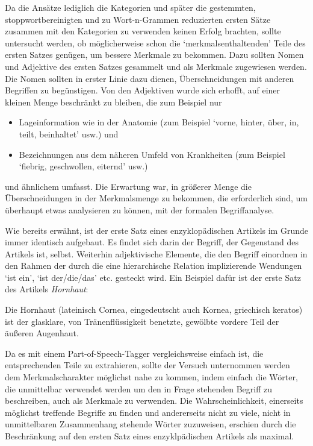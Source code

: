\documentclass[pagesize,DIV=calc,12pt,draft]{scrreprt}
\begin{document}
Da die Ansätze lediglich die Kategorien und später die gestemmten,
stoppwortbereinigten und zu Wort-n-Grammen reduzierten ersten Sätze
zusammen mit den Kategorien zu verwenden keinen Erfolg brachten, sollte
untersucht werden, ob möglicherweise schon die `merkmalsenthaltenden'
Teile des ersten Satzes genügen, um bessere Merkmale zu bekommen. Dazu
sollten Nomen und Adjektive des ersten Satzes gesammelt und als Merkmale
zugewiesen werden. Die Nomen sollten in erster Linie dazu dienen,
Überschneidungen mit anderen Begriffen zu begünstigen. Von den
Adjektiven wurde sich erhofft, auf einer kleinen Menge beschränkt zu
bleiben, die zum Beispiel nur

\begin{itemize}
\itemsep1pt\parskip0pt
\item
  Lageinformation wie in der Anatomie (zum Beispiel `vorne, hinter,
  über, in, teilt, beinhaltet' usw.) und
\item
  Bezeichnungen aus dem näheren Umfeld von Krankheiten (zum Beispiel
  `fiebrig, geschwollen, eiternd' usw.)
\end{itemize}

und ähnlichem umfasst. Die Erwartung war, in größerer Menge die
Überschneidungen in der Merkmalsmenge zu bekommen, die erforderlich
sind, um überhaupt etwas analysieren zu können, mit der formalen
Begriffanalyse.

Wie bereits erwähnt, ist der erste Satz eines enzyklopädischen Artikels
im Grunde immer identisch aufgebaut. Es findet sich darin der Begriff,
der Gegenstand des Artikels ist, selbst. Weiterhin adjektivische
Elemente, die den Begriff einordnen in den Rahmen der durch die eine
hierarchische Relation implizierende Wendungen `ist ein', `ist
der/die/das' etc. gesteckt wird. Ein Beispiel dafür ist der erste Satz
des Artikels \emph{Hornhaut}:

\begin{description}
\itemsep1pt\parskip0pt
\item[Hornhaut]
Die Hornhaut (lateinisch Cornea, eingedeutscht auch Kornea, griechisch
keratos) ist der glasklare, von Tränenflüssigkeit benetzte, gewölbte
vordere Teil der äußeren Augenhaut.
\end{description}

Da es mit einem Part-of-Speech-Tagger vergleichsweise einfach ist, die
entsprechenden Teile zu extrahieren, sollte der Versuch unternommen
werden dem Merkmalscharakter möglichst nahe zu kommen, indem einfach die
Wörter, die unmittelbar verwendet werden um den in Frage stehenden
Begriff zu beschreiben, auch als Merkmale zu verwenden. Die
Wahrscheinlichkeit, einerseits möglichst treffende Begriffe zu finden
und andererseits nicht zu viele, nicht in unmittelbaren Zusammenhang
stehende Wörter zuzuweisen, erschien durch die Beschränkung auf den
ersten Satz eines enzyklpädischen Artikels als maximal.
\end{document}

